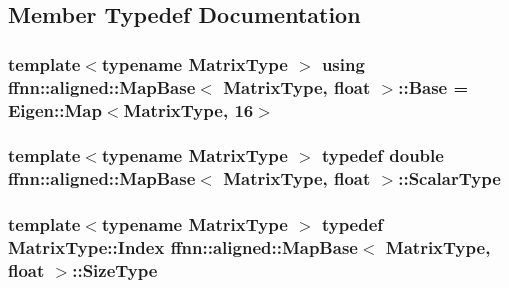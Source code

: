 \subsection{Member Typedef Documentation}
\hypertarget{structffnn_1_1aligned_1_1_map_base_3_01_matrix_type_00_01float_01_4_a06ddb34196d951e0ea339d9f90326386}{
\subsubsection[{Base}]{\setlength{\rightskip}{0pt plus 5cm}template$<$typename Matrix\-Type $>$ using {\bf ffnn\-::aligned\-::\-Map\-Base}$<$ Matrix\-Type, float $>$\-::{\bf Base} =  Eigen\-::\-Map$<$Matrix\-Type, 16$>$}}\label{structffnn_1_1aligned_1_1_map_base_3_01_matrix_type_00_01float_01_4_a06ddb34196d951e0ea339d9f90326386}
\hypertarget{structffnn_1_1aligned_1_1_map_base_3_01_matrix_type_00_01float_01_4_af122e87e7c75f175c601c93903f27551}{
\subsubsection[{Scalar\-Type}]{\setlength{\rightskip}{0pt plus 5cm}template$<$typename Matrix\-Type $>$ typedef double {\bf ffnn\-::aligned\-::\-Map\-Base}$<$ Matrix\-Type, float $>$\-::{\bf Scalar\-Type}}}\label{structffnn_1_1aligned_1_1_map_base_3_01_matrix_type_00_01float_01_4_af122e87e7c75f175c601c93903f27551}
\hypertarget{structffnn_1_1aligned_1_1_map_base_3_01_matrix_type_00_01float_01_4_ae7b5a2041350187cb9dedb504c7c9ade}{
\subsubsection[{Size\-Type}]{\setlength{\rightskip}{0pt plus 5cm}template$<$typename Matrix\-Type $>$ typedef Matrix\-Type\-::\-Index {\bf ffnn\-::aligned\-::\-Map\-Base}$<$ Matrix\-Type, float $>$\-::{\bf Size\-Type}}}\label{structffnn_1_1aligned_1_1_map_base_3_01_matrix_type_00_01float_01_4_ae7b5a2041350187cb9dedb504c7c9ade}


